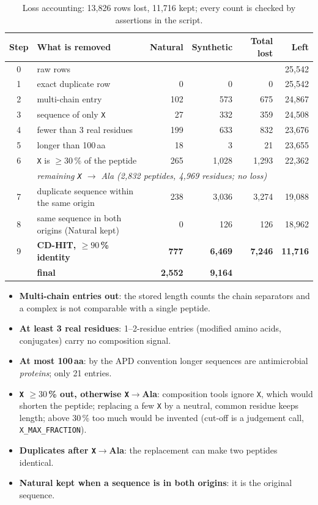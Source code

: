 \documentclass[11pt,a4paper]{article}
\newcommand{\amin}{\,aa}
\begin{document}
\begin{table}[H]\centering\small\setlength{\tabcolsep}{3pt}
\begin{tabular}{clrrrr}
\toprule
Step & What is removed & Natural & Synthetic & Total lost & Left\\\midrule
0 & raw rows & & & & 25{,}542\\
1 & exact duplicate row & 0 & 0 & 0 & 25{,}542\\
2 & multi-chain entry & 102 & 573 & 675 & 24{,}867\\
3 & sequence of only \texttt{X} & 27 & 332 & 359 & 24{,}508\\
4 & fewer than 3 real residues & 199 & 633 & 832 & 23{,}676\\
5 & longer than 100\amin & 18 & 3 & 21 & 23{,}655\\
6 & \texttt{X} is $\geq 30$\,\% of the peptide & 265 & 1{,}028 & 1{,}293 & 22{,}362\\
  & \multicolumn{5}{l}{\emph{remaining \texttt{X} $\rightarrow$ Ala (2{,}832 peptides, 4{,}969 residues; no loss)}}\\
7 & duplicate sequence within the same origin & 238 & 3{,}036 & 3{,}274 & 19{,}088\\
8 & same sequence in both origins (Natural kept) & 0 & 126 & 126 & 18{,}962\\
9 & \textbf{CD-HIT, $\geq 90$\,\% identity} & \textbf{777} & \textbf{6{,}469} & \textbf{7{,}246} & \textbf{11{,}716}\\\midrule
 & \textbf{final} & \textbf{2{,}552} & \textbf{9{,}164} & & \\\bottomrule
\end{tabular}
\caption{Loss accounting: 13{,}826 rows lost, 11{,}716 kept; every count is checked by assertions in the script.}
\label{tab:loss}
\end{table}

\begin{whyso}
\begin{itemize}
\item \textbf{Multi-chain entries out}: the stored length counts the chain separators and a complex is not comparable with a single peptide.
\item \textbf{At least 3 real residues}: 1--2-residue entries (modified amino acids, conjugates) carry no composition signal.
\item \textbf{At most 100\amin}: by the APD convention longer sequences are antimicrobial \emph{proteins}; only 21 entries.
\item \textbf{\texttt{X} $\geq 30$\,\% out, otherwise \texttt{X}$\rightarrow$Ala}: composition tools ignore \texttt{X}, which would shorten the peptide; replacing a few \texttt{X} by a neutral,
  common residue keeps length; above 30\,\% too much would be invented (cut-off is a judgement call, \texttt{X\_MAX\_FRACTION}).
\item \textbf{Duplicates after \texttt{X}$\rightarrow$Ala}: the replacement can make two peptides identical.
\item \textbf{Natural kept when a sequence is in both origins}: it is the original sequence.
\end{itemize}
\end{whyso}
\end{document}
